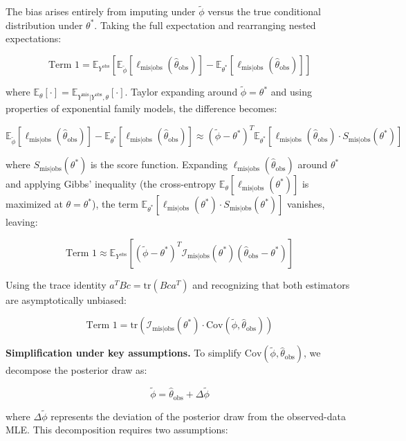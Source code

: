 \documentclass[
]{article}
\begin{document}
The bias arises entirely from imputing under \(\tilde{\phi}\) versus the
true conditional distribution under \(\theta^*\). Taking the full
expectation and rearranging nested expectations:

\[\text{Term 1} = \mathbb{E}_{Y^{\text{obs}}}\left[\mathbb{E}_{\tilde{\phi}}[\ell_{\text{mis}|\text{obs}}(\hat{\theta}_{\text{obs}})] - \mathbb{E}_{\theta^*}[\ell_{\text{mis}|\text{obs}}(\hat{\theta}_{\text{obs}})]\right]\]

where
\(\mathbb{E}_{\theta}[\cdot] = \mathbb{E}_{Y^{\text{mis}}|Y^{\text{obs}},\theta}[\cdot]\).
Taylor expanding around \(\tilde{\phi} = \theta^*\) and using properties
of exponential family models, the difference becomes:

\[\mathbb{E}_{\tilde{\phi}}[\ell_{\text{mis}|\text{obs}}(\hat{\theta}_{\text{obs}})] - \mathbb{E}_{\theta^*}[\ell_{\text{mis}|\text{obs}}(\hat{\theta}_{\text{obs}})] \approx (\tilde{\phi} - \theta^*)^T \mathbb{E}_{\theta^*}[\ell_{\text{mis}|\text{obs}}(\hat{\theta}_{\text{obs}}) \cdot S_{\text{mis}|\text{obs}}(\theta^*)]\]

where \(S_{\text{mis}|\text{obs}}(\theta^*)\) is the score function.
Expanding \(\ell_{\text{mis}|\text{obs}}(\hat{\theta}_{\text{obs}})\)
around \(\theta^*\) and applying Gibbs' inequality (the cross-entropy
\(\mathbb{E}_{\theta}[\ell_{\text{mis}|\text{obs}}(\theta^*)]\) is
maximized at \(\theta = \theta^*\)), the term
\(\mathbb{E}_{\theta^*}[\ell_{\text{mis}|\text{obs}}(\theta^*) \cdot S_{\text{mis}|\text{obs}}(\theta^*)]\)
vanishes, leaving:

\[\text{Term 1} \approx \mathbb{E}_{Y^{\text{obs}}}\left[(\tilde{\phi} - \theta^*)^T \mathcal{I}_{\text{mis}|\text{obs}}(\theta^*)(\hat{\theta}_{\text{obs}} - \theta^*)\right]\]

Using the trace identity \(a^T B c = \text{tr}(B c a^T)\) and
recognizing that both estimators are asymptotically unbiased:

\[\text{Term 1} = \text{tr}\left(\mathcal{I}_{\text{mis}|\text{obs}}(\theta^*) \cdot \text{Cov}(\tilde{\phi}, \hat{\theta}_{\text{obs}})\right)\]

\textbf{Simplification under key assumptions.} To simplify
\(\text{Cov}(\tilde{\phi}, \hat{\theta}_{\text{obs}})\), we decompose
the posterior draw as:

\[\tilde{\phi} = \hat{\theta}_{\text{obs}} + \Delta\tilde{\phi}\]

where \(\Delta\tilde{\phi}\) represents the deviation of the posterior
draw from the observed-data MLE. This decomposition requires two
assumptions:
\end{document}
